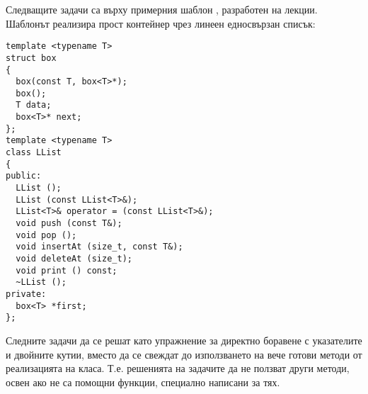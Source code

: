 \begin{mdframed}[hidealllines=true,backgroundcolor=gray!20]
Следващите задачи са върху примерния шаблон , разработен на лекции. Шаблонът реализира прост контейнер чрез линеен едносвързан списък:
\begin{verbatim}
template <typename T>
struct box
{
  box(const T, box<T>*);
  box();
  T data;
  box<T>* next;
};
template <typename T>
class LList
{
public:
  LList ();
  LList (const LList<T>&);
  LList<T>& operator = (const LList<T>&);
  void push (const T&);
  void pop ();
  void insertAt (size_t, const T&);
  void deleteAt (size_t);
  void print () const;
  ~LList ();
private:
  box<T> *first;
};

\end{verbatim}
Следните задачи да се решат като упражнение за директно боравене с указателите и двойните кутии, вместо да се свеждат до използването на вече готови методи от реализацията на класа. Т.е. решенията на задачите да не ползват други методи, освен ако не са помощни функции, специално написани за тях.
\end{mdframed}

